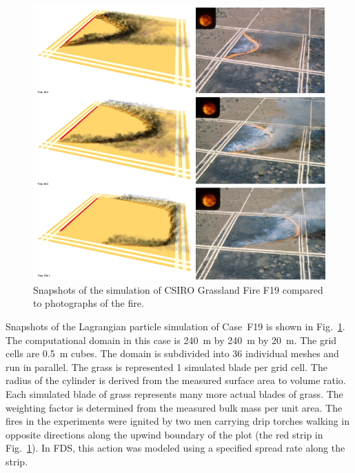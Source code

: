 \begin{figure}[p]
\includegraphics[width=\textwidth]{FIGURES/CSIRO_Grassland_Fires/F19_collage.png}
\caption[Snapshots of the simulation of CSIRO Grassland Fire F19]{Snapshots of the simulation of CSIRO Grassland Fire F19 compared to photographs of the fire.}
\label{F19}
\end{figure}

Snapshots of the Lagrangian particle simulation of Case~F19 is shown in Fig.~\ref{F19}. The computational domain in this case is 240~m by 240~m by 20~m. The grid cells are 0.5~m cubes. The domain is subdivided into 36 individual meshes and run in parallel. The grass is represented 1 simulated blade per grid cell. The radius of the cylinder is derived from the measured surface area to volume ratio. Each simulated blade of grass represents many more actual blades of grass. The weighting factor is determined from the measured bulk mass per unit area. The fires in the experiments were ignited by two men carrying drip torches walking in opposite directions along the upwind boundary of the plot (the red strip in Fig.~\ref{F19}). In FDS, this action was modeled using a specified spread rate along the strip.

